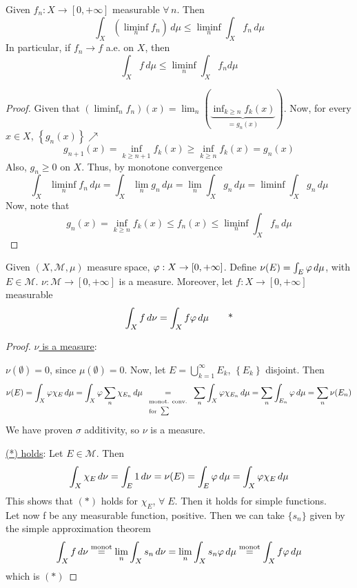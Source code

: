 \begin{lemma}
    Given \(f_n: X \to [0, +\infty]\) measurable \(\forall \, n\). Then 
    \[
        \int_X (\liminf_n f_n) \, d\mu \leq \liminf_n \int_X f_n \, d\mu
    \]
    In particular, if \(f_n \to f\) a.e. on \(X\), then
    \[
        \int_X f \, d\mu \leq \liminf_n \int_X f_n d\mu
    \]
\end{lemma}

\begin{proof}
    Given that \((\liminf_n f_n)(x) = \lim_n (\underbrace{\inf_{k \geq n} f_k(x)}_{= g_n (x)})\). Now, for every \(x \in X\), \(\left\{ g_n(x) \right\}\nearrow\)
    \[
        g_{n+1}(x) = \inf_{k \geq n+1} f_k(x) \geq \inf_{k \geq n} f_k(x) = g_n (x)
    \]
    Also, \(g_n \geq 0\) on \(X\). Thus, by monotone convergence
    \[
        \int_X \liminf_n f_n \, d\mu = \int_X \lim_n g_n \, d\mu = \lim_n \int_X g_n \, d\mu = \liminf \int_X g_n \, d\mu
    \]
    Now, note that \[g_n (x) = \inf_{k\geq n} f_k(x) \leq f_n(x) \leq \liminf_n \int_X f_n \, d\mu\]
\end{proof}

\begin{theorem}
    Given \((X, \mathcal{M}, \mu)\) measure space, \(\oldphi : X \to [0, +\infty]\). Define \(\nu(E) = \int_E \oldphi \, d\mu\), with \(E \in \mathcal{M}\). 
    \(\nu : \mathcal{M} \to [0, +\infty]\) is a measure. Moreover, let \(f:X \to [0, +\infty]\) measurable
    \[
        \int_X f \, d\nu = \int_X f\oldphi \, d\mu \tag*{*}
    \]
\end{theorem}
\begin{proof}
    \noindent\underline{\(\nu\) is a measure}:  

    \(\nu(\emptyset) = 0\), since \(\mu(\emptyset) = 0\). 
    Now, let \(E = \bigcup_{k=1}^{\infty} E_k\), \(\left\{ E_k \right\}\) disjoint. Then 
    \[
        \nu(E) = \int_X \oldphi\chi_{E} \, d\mu = \int_X \oldphi\sum_n \chi_{E_n} \, d\mu \underset{\begin{array}{l} \text{\scriptsize{monot. conv.}} \\ 
            \text{\scriptsize{for }}\textstyle\sum\end{array}}{=}  \sum_n \int_X \oldphi \chi_{E_n} \, d\mu = \sum_n \int_{E_n} \oldphi \, d\mu = \sum_n \nu(E_n) 
    \]
    We have proven \(\sigma\) additivity, so \(\nu\) is a measure.

    \noindent\underline{(*) holds}:
    Let \(E \in \mathcal{M}\). Then
    \[
        \int_X \chi_E \, d\nu = \int_E 1 \, d\nu = \nu(E)  = \int_E \oldphi \, d\mu = \int_X \oldphi \chi_E \, d\mu
    \]
    This shows that \((*)\) holds for \(\chi_E\), \(\forall \; E\). Then it holds for simple functions. \\
    Let now f be any measurable function, positive. Then we can take \(\{s_n\}\) given by the simple approximation theorem
    \[
        \int_X f \, d\nu \overset{\text{monot}}{=} \lim_n \int_X s_n \, d\nu = \lim_n \int_X s_n \oldphi \, d\mu \overset{\text{monot}}{=} \int_X f \oldphi \, d\mu 
    \]
    which is \((*)\) 
\end{proof}

